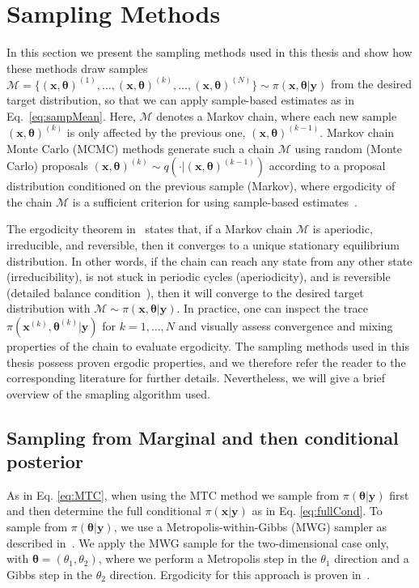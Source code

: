 \section{Sampling Methods}
\label{sec:sampling}
In this section we present the sampling methods used in this thesis and show how these methods draw samples $ \mathcal{M} = \{ (\bm{x}, \bm{\theta} )^{(1)}, \dots, (\bm{x}, \bm{\theta} )^{(k)}, \dots, (\bm{x}, \bm{\theta})^{(N)} \} \sim \pi(\bm{x}, \bm{\theta} |  \bm{y})$ from the desired target distribution, so that we can apply sample-based estimates as in Eq.~\ref{eq:sampMean}.
Here, $\mathcal{M}$ denotes a Markov chain, where each new sample $(\bm{x}, \bm{\theta})^{(k)}$ is only affected by the previous one, $(\bm{x}, \bm{\theta})^{(k-1)}$.
Markov chain Monte Carlo (MCMC) methods generate such a chain $\mathcal{M}$ using random (Monte Carlo) proposals $(\bm{x}, \bm{\theta})^{(k)} \sim q( \cdot |  (\bm{x}, \bm{\theta})^{(k-1)})$ according to a proposal distribution conditioned on the previous sample (Markov), where ergodicity of the chain $\mathcal{M}$ is a sufficient criterion for using sample-based estimates~\cite{tan2016LecNot, roberts2004general}.

The ergodicity theorem in~\cite{tan2016LecNot} states that, if a Markov chain $\mathcal{M}$ is aperiodic, irreducible, and reversible, then it converges to a unique stationary equilibrium distribution.
In other words, if the chain can reach any state from any other state (irreducibility), is not stuck in periodic cycles (aperiodicity), and is reversible (detailed balance condition~\cite{tan2016LecNot}), then it will converge to the desired target distribution  with $ \mathcal{M} \sim \pi(\bm{x}, \bm{\theta} |  \bm{y})$.
In practice, one can inspect the trace $\pi(\bm{x}^{(k)}, \bm{\theta}^{(k)} |  \bm{y})$ for $k = 1, \dots, N$ and visually assess convergence and mixing properties of the chain to evaluate ergodicity.
The sampling methods used in this thesis possess proven ergodic properties, and we therefore refer the reader to the corresponding literature for further details.
Nevertheless, we will give a brief overview of the smapling algorithm used.

\subsection{Sampling from Marginal and then conditional posterior}
As in Eq. \ref{eq:MTC}, when using the MTC method we sample from $\pi(\bm{\theta} |  \bm{y})$ first and then determine the full conditional $\pi(\bm{x} |  \bm{y})$ as in Eq. \ref{eq:fullCond}. To sample from $\pi(\bm{\theta} |  \bm{y})$, we use a Metropolis-within-Gibbs (MWG) sampler as described in~\cite{fox2016fast}.
We apply the MWG sample for the two-dimensional case only, with $\bm{\theta} = (\theta_1, \theta_2)$, where we perform a Metropolis step in the $\theta_1$ direction and a Gibbs step in the $\theta_2$ direction.
Ergodicity for this approach is proven in~\cite{roberts2006harris}.


